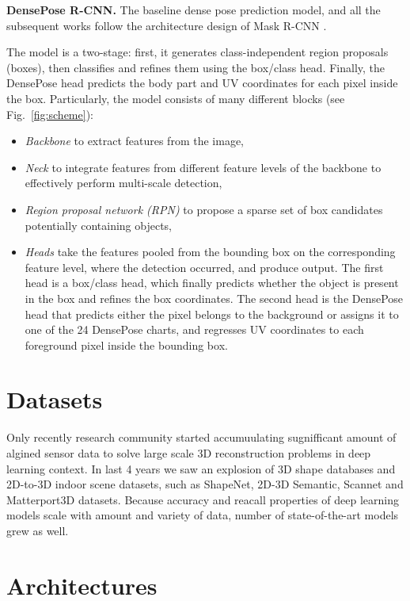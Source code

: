 \noindent \textbf{DensePose R-CNN.} The baseline dense pose prediction model, and all the subsequent works \cite{parsing, uncertainty, monkeys} follow the architecture design of Mask R-CNN \cite{maskrcnn}.

The model is a two-stage: first, it generates class-independent region proposals (boxes), then classifies and refines them using the box/class head. Finally, the DensePose head predicts the body part and UV coordinates for each pixel inside the box. Particularly, the model consists of many different blocks (see Fig.~\ref{fig:scheme}):
\begin{itemize}
    \item \textit{Backbone} to extract features from the image,
    \item \textit{Neck} to integrate features from different feature levels of the backbone to effectively perform multi-scale detection,
    \item \textit{Region proposal network (RPN)} to propose a sparse set of box candidates potentially containing objects,
    \item \textit{Heads} take the features pooled from the bounding box on the corresponding feature level, where the detection occurred, and produce output. The first head is a box/class head, which finally predicts whether the object is present in the box and refines the box coordinates. The second head is the DensePose head that predicts either the pixel belongs to the background or assigns it to one of the 24 DensePose charts, and regresses UV coordinates to each foreground pixel inside the bounding box.
\end{itemize}

\section{Datasets}

Only recently research community started accumuulating sugnifficant amount of algined sensor data to solve large scale 3D reconstruction problems in deep learning context. In last 4 years we saw an explosion of 3D shape databases and 2D-to-3D indoor scene datasets, such as ShapeNet, 2D-3D Semantic, Scannet and Matterport3D datasets. Because accuracy and reacall properties of deep learning models scale with amount and variety of data, number of state-of-the-art models grew as well.

\section{Architectures}

